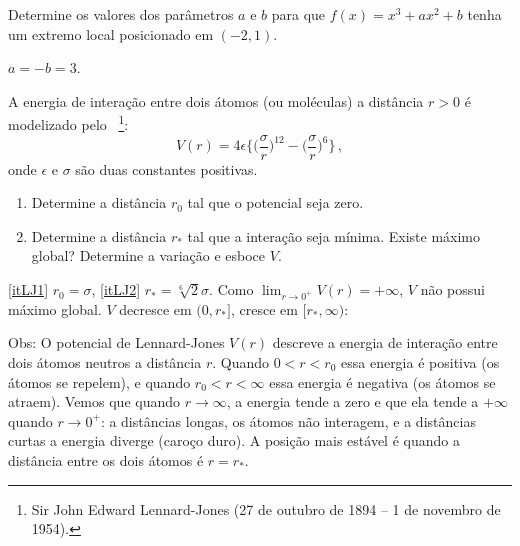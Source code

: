 \begin{exo}
Determine os valores dos parâmetros $a$ e $b$ para que $f(x)=x^3+ax^2+b$ tenha
um extremo local posicionado em $(-2,1)$.
\begin{sol}
$a=-b=3$.
\end{sol}
\end{exo}

\begin{exo} A energia de interação entre dois átomos (ou moléculas) a
distância $r>0$ é modelizado pelo ~\footnote{Sir John Edward Lennard-Jones (27 de outubro de 1894 –
1 de novembro de 1954).}:
$$
V(r)=4\epsilon\Big\{
\big(\frac{\sigma}{r}\big)^{12}
-\big(\frac{\sigma}{r}\big)^6
\Big\}\,,
$$
onde $\epsilon$ e $\sigma$ são duas constantes positivas.
\begin{enumerate}
 \item\label{itLJ1} Determine a distância $r_0$ tal que o potencial seja zero.
\item\label{itLJ2} Determine a distância $r_*$ tal que a interação seja mínima.
Existe máximo global? Determine a variação e esboce $V$.
\end{enumerate}
\begin{sol}
\eqref{itLJ1} $r_0=\sigma$, \eqref{itLJ2} $r_*=\sqrt[6]{2}\sigma$. 
Como $\lim_{r\to 0^+}V(r)=+\infty$, $V$ não possui máximo global.
$V$ decresce em $(0,r_*]$, cresce em $[r_*,\infty)$:
\begin{center}
\begin{bmlimage}\end{bmlimage}
\end{center}
Obs: O potencial de Lennard-Jones $V(r)$ descreve a energia de interação entre
dois átomos neutros a distância $r$. 
Quando $0<r<r_0$ essa energia é positiva (os átomos se repelem), e quando
$r_0<r<\infty$ essa energia é negativa (os átomos se atraem).
Vemos que quando $r\to \infty$, a energia tende a zero e que ela tende a
$+\infty$ quando $r\to 0^+$: a distâncias longas, os átomos não interagem, e a
distâncias curtas a energia diverge (caroço duro).
A posição mais estável é quando a distância entre os dois átomos é
$r=r_*$.
\end{sol}
\end{exo}

